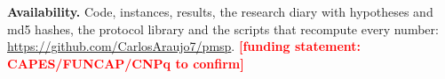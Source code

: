 \documentclass[conference,a4paper]{IEEEtran}
\newif\ifdraftmarks \draftmarkstrue
\newif\ifanon \anonfalse %
\newcommand{\todonote}[1]{\ifdraftmarks\textcolor{red}{\textbf{[#1]}}\fi}
\begin{document}
\vspace{1mm}
\noindent\textbf{Availability.} Code, instances, results, the research diary with hypotheses and md5 hashes, the protocol library and the scripts that recompute every number:
\ifanon an anonymized repository (link in the submission system).\else\url{https://github.com/CarlosAraujo7/pmsp}. \todonote{funding statement: CAPES/FUNCAP/CNPq to confirm}\fi



\end{document}
